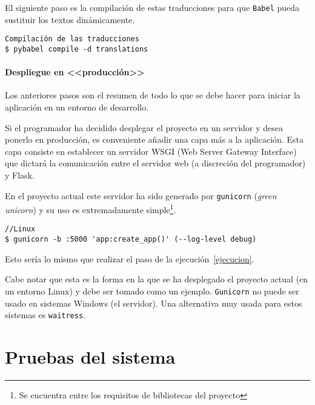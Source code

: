 El siguiente paso es la compilación de estas traducciones para que \texttt{Babel} pueda sustituir
los textos dinámicamente.

\begin{tcolorbox}[colback=cyan!5!white,colframe=cyan!75!black,fontupper=\footnotesize,title=Compilación de traducciones (desde \texttt{/web/app})]
\begin{verbatim}
Compilación de las traducciones
$ pybabel compile -d translations 
\end{verbatim}
\end{tcolorbox}

\paragraph{Despliegue en <<producción>>} Los anteriores pasos son el resumen de
todo lo que se debe hacer para iniciar la aplicación en un entorno de
desarrollo. 

Si el programador ha decidido desplegar el proyecto en un servidor y desea
ponerlo en producción, es conveniente añadir una capa más a la aplicación. Esta
capa consiste en establecer un servidor WSGI (Web Server Gateway Interface) que
dictará la comunicación entre el servidor web (a discreción del programador) y
Flask. 

En el proyecto actual este servidor ha sido generado por \texttt{gunicorn}
(\textit{green unicorn}) y su uso es extremadamente simple\footnote{Se
encuentra entre los requisitos de bibliotecas del proyecto}.


\begin{tcolorbox}[colback=cyan!5!white,colframe=cyan!75!black,fontupper=\footnotesize,title=Lanzar servidor WSGI sobre la aplicación]
\begin{verbatim}
//Linux
$ gunicorn -b :5000 'app:create_app()' (--log-level debug)
\end{verbatim}
\end{tcolorbox}

Esto sería lo mismo que realizar el paso de la ejecución~\ref{ejecucion}.

Cabe notar que esta es la forma en la que se ha desplegado el proyecto actual
(en un entorno Linux) y debe ser tomado como un ejemplo. \texttt{Gunicorn} no
puede ser usado en sistemas Windows (el servidor). Una alternativa muy usada
para estos sistemas es \texttt{waitress}.

\section{Pruebas del sistema}

